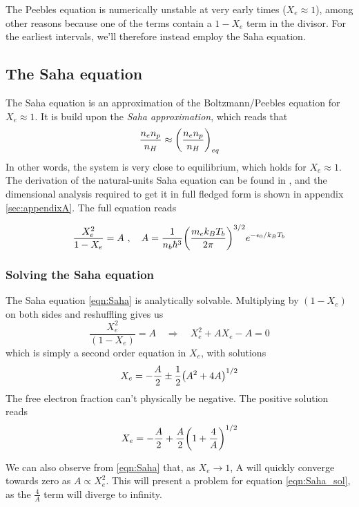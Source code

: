 \documentclass[10pt, a4paper]{article}
\begin{document}
The Peebles equation is numerically unstable at very early times ($X_e \approx 1$), among other reasons because one of the terms contain a $1-X_e$ term in the divisor. For the earliest intervals, we'll therefore instead employ the Saha equation.


\subsection{The Saha equation}
The Saha equation is an approximation of the Boltzmann/Peebles equation for $X_e \approx 1$. It is build upon the \textit{Saha approximation}, which reads that
\begin{equation*}
    \frac{n_e n_p}{n_H} \approx \qty(\frac{n_e n_p}{n_H})_{eq}
\end{equation*}
In other words, the system is very close to equilibrium, which holds for $X_e\approx 1$. The derivation of the natural-units Saha equation can be found in \cite[p. 70]{ModernCosmology2003}, and the dimensional analysis required to get it in full fledged form is shown in appendix \ref{sec:appendixA}. The full equation reads

\begin{equation}\label{eqn:Saha}
    \frac{X_{e}^{2}}{1-X_{e}} = A\ , \quad A = \frac{1}{n_{b}\hbar^3}\qty(\frac{m_{e} k_B T_{b}}{2 \pi})^{3 / 2} e^{-\epsilon_{0} / k_B T_{b}}
\end{equation}

\subsubsection{Solving the Saha equation}
The Saha equation \ref{eqn:Saha} is analytically solvable. Multiplying by $(1-X_e)$ on both sides and reshuffling gives us
\begin{equation*}
    \frac{X_e^2}{(1-X_e)} = A \quad \Rightarrow \quad X_e^2 + AX_e - A = 0
\end{equation*}
which is simply a second order equation in $X_e$, with solutions
\begin{equation*}
    X_e = - \frac{A}{2} \pm \frac{1}{2}\qty(A^2 + 4A)^{1/2}
\end{equation*}
The free electron fraction can't physically be negative. The positive solution reads
\begin{equation}\label{eqn:Saha_sol}
    X_e = - \frac{A}{2} + \frac{A}{2}\qty(1 + \frac{4}{A})^{1/2}
\end{equation}

We can also observe from \ref{eqn:Saha} that, as $X_e \rightarrow 1$, A will quickly converge towards zero as $A \propto X_e^2$. This will present a problem for equation \ref{eqn:Saha_sol}, as the $\frac{4}{A}$ term will diverge to infinity.
\end{document}

